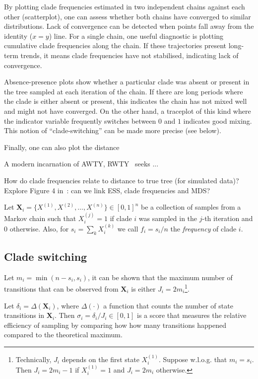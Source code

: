 By plotting clade frequencies estimated in two independent chains against each other (scatterplot), one can assess whether both chains have converged to similar distributions.
Lack of convergence can be detected when points fall away from the identity ($x = y$) line.
For a single chain, one useful diagnostic is plotting cumulative clade frequencies along the chain.
If these trajectories present long-term trends, it means clade frequencies have not stabilised, indicating lack of convergence.

Absence-presence plots show whether a particular clade was absent or present in the tree sampled at each iteration of the chain.
If there are long periods where the clade is either absent or present, this indicates the chain has not mixed well and might not have converged.
On the other hand, a traceplot of this kind where the indicator variable frequently switches between $0$ and $1$ indicates good mixing.
This notion of ``clade-switching'' can be made more precise (see below).

Finally, one can also plot the distance 


A modern incarnation of AWTY, RWTY~\citep{Warren2017} seeks ...

How do clade frequencies relate to distance to true tree (for simulated data)?
Explore Figure 4 in~\cite{Lakner2008}: can we link ESS, clade frequencies and MDS?

Let $\boldsymbol X_i = \{X^{(1)}, X^{(2)}, \ldots, X^{(n)}\} \in [0, 1]^n$ be a collection of samples from a Markov chain such that $X^{(j)}_i = 1$ if clade $i$ was sampled in the $j$-th iteration and $0$ otherwise.
Also, for $s_i = \sum_k X_i^{(k)}$ we call $f_i = s_i/n$ the \textit{frequency} of clade $i$.

\subsection{Clade switching}

Let $m_i = \min(n - s_i, s_i)$, it can be shown that the maximum number of transitions that can be observed from $\boldsymbol X_i$ is either $J_i = 2 m_i$\footnote{Technically, $J_i$ depends on the first state $X_i^{(1)}$.
Suppose w.l.o.g. that $m_i = s_i$.
Then $J_i = 2 m_i - 1$ if $X_i^{(1)} = 1$ and $J_i = 2 m_i$ otherwise.}.

Let $\delta_i = \Delta(\boldsymbol X_i)$, where $\Delta(\cdot)$ a function that counts the number of state transitions in $\boldsymbol X_i$.
Then $\sigma_i = \delta_i/J_i \in [0, 1]$ is a score that measures the relative efficiency of sampling by comparing how how many transitions happened compared to the theoretical maximum. 


